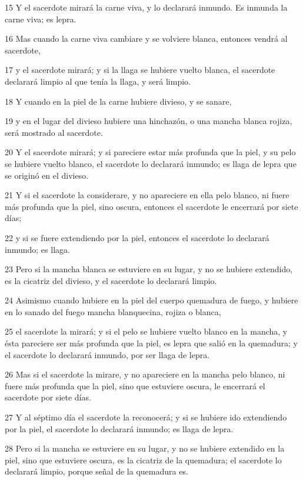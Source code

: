 \par 15 Y el sacerdote mirará la carne viva, y lo declarará inmundo. Es inmunda la carne viva; es lepra.
\par 16 Mas cuando la carne viva cambiare y se volviere blanca, entonces vendrá al sacerdote,
\par 17 y el sacerdote mirará; y si la llaga se hubiere vuelto blanca, el sacerdote declarará limpio al que tenía la llaga, y será limpio.
\par 18 Y cuando en la piel de la carne hubiere divieso, y se sanare,
\par 19 y en el lugar del divieso hubiere una hinchazón, o una mancha blanca rojiza, será mostrado al sacerdote.
\par 20 Y el sacerdote mirará; y si pareciere estar más profunda que la piel, y su pelo se hubiere vuelto blanco, el sacerdote lo declarará inmundo; es llaga de lepra que se originó en el divieso.
\par 21 Y si el sacerdote la considerare, y no apareciere en ella pelo blanco, ni fuere más profunda que la piel, sino oscura, entonces el sacerdote le encerrará por siete días;
\par 22 y si se fuere extendiendo por la piel, entonces el sacerdote lo declarará inmundo; es llaga.
\par 23 Pero si la mancha blanca se estuviere en su lugar, y no se hubiere extendido, es la cicatriz del divieso, y el sacerdote lo declarará limpio.
\par 24 Asimismo cuando hubiere en la piel del cuerpo quemadura de fuego, y hubiere en lo sanado del fuego mancha blanquecina, rojiza o blanca,
\par 25 el sacerdote la mirará; y si el pelo se hubiere vuelto blanco en la mancha, y ésta pareciere ser más profunda que la piel, es lepra que salió en la quemadura; y el sacerdote lo declarará inmundo, por ser llaga de lepra.
\par 26 Mas si el sacerdote la mirare, y no apareciere en la mancha pelo blanco, ni fuere más profunda que la piel, sino que estuviere oscura, le encerrará el sacerdote por siete días.
\par 27 Y al séptimo día el sacerdote la reconocerá; y si se hubiere ido extendiendo por la piel, el sacerdote lo declarará inmundo; es llaga de lepra.
\par 28 Pero si la mancha se estuviere en su lugar, y no se hubiere extendido en la piel, sino que estuviere oscura, es la cicatriz de la quemadura; el sacerdote lo declarará limpio, porque señal de la quemadura es.
